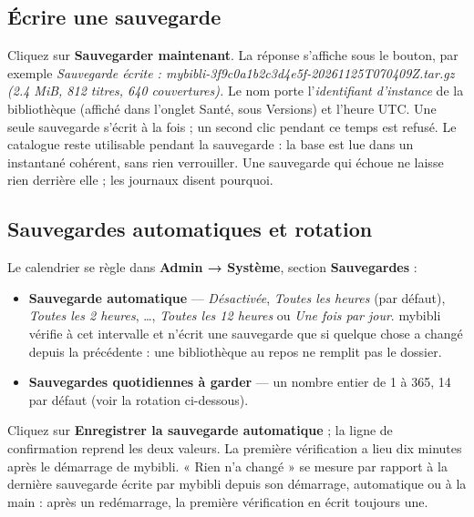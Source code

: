 \subsection*{Écrire une sauvegarde}

Cliquez sur \textbf{Sauvegarder maintenant}. La réponse s'affiche sous
le bouton, par exemple \emph{Sauvegarde écrite :
mybibli-3f9c0a1b2c3d4e5f-20261125T070409Z.tar.gz (2.4 MiB, 812 titres,
640 couvertures).} Le nom porte l'\emph{identifiant d'instance} de la
bibliothèque (affiché dans l'onglet Santé, sous Versions) et l'heure
UTC. Une seule sauvegarde s'écrit à la fois ; un second clic pendant ce
temps est refusé. Le catalogue reste utilisable pendant la sauvegarde :
la base est lue dans un instantané cohérent, sans rien verrouiller. Une
sauvegarde qui échoue ne laisse rien derrière elle ; les journaux
disent pourquoi.

\subsection*{Sauvegardes automatiques et rotation}
\label{sec:backups-schedule}

Le calendrier se règle dans \textbf{Admin → Système}, section
\textbf{Sauvegardes} :

\begin{itemize}
  \item \textbf{Sauvegarde automatique} --- \emph{Désactivée},
        \emph{Toutes les heures} (par défaut), \emph{Toutes les 2
        heures}, \dots, \emph{Toutes les 12 heures} ou \emph{Une fois
        par jour}. mybibli vérifie à cet intervalle et n'écrit une
        sauvegarde que si quelque chose a changé depuis la précédente :
        une bibliothèque au repos ne remplit pas le dossier.
  \item \textbf{Sauvegardes quotidiennes à garder} --- un nombre entier
        de 1 à 365, 14 par défaut (voir la rotation ci-dessous).
\end{itemize}

Cliquez sur \textbf{Enregistrer la sauvegarde automatique} ; la ligne
de confirmation reprend les deux valeurs. La première vérification a
lieu dix minutes après le démarrage de mybibli. « Rien n'a changé »
se mesure par rapport à la dernière sauvegarde écrite par mybibli
depuis son démarrage, automatique ou à la main : après un redémarrage,
la première vérification en écrit toujours une.

